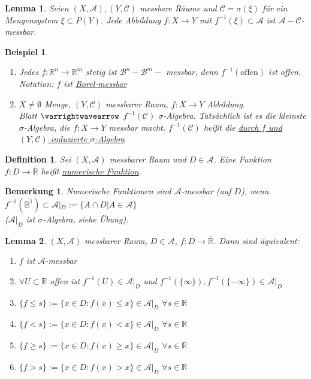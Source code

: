 \documentclass[11pt]{memoir}
\theoremstyle{changebreak}
\newtheorem{Definition}{Definition}[chapter]
\newtheorem{Bemerkung}{Bemerkung}[chapter]
\newtheorem{Beispiel}{Beispiel}[chapter]
\newtheorem{Lemma}{Lemma}[chapter]
\begin{document}
\begin{Lemma}
Seien $(X, \mathscr{A}), (Y, \mathscr{C})$ messbare Räume und $\mathscr{C} = \sigma(\xi)$ für ein Mengensystem $\xi \subset P(Y)$. Jede Abbildung $f: X \rightarrow Y$ mit $f^{-1}(\xi) \subset \mathscr{A}$ ist $\mathscr{A}-\mathscr{C}$-messbar.
\end{Lemma}

\begin{Beispiel}
\begin{enumerate}
	\item Jedes $f: \mathbb{R}^n \rightarrow \mathbb{R}^m$ stetig ist $\mathscr{B}^n-\mathscr{B}^m-$ messbar, denn $f^{-1}(\text{offen})$ ist offen. \\
	\emph{Notation}: $f$ ist \underline{Borel-messbar}
	\item $X \ne \emptyset$ Menge, $(Y, \mathscr{C})$ messbarer Raum, $f: X \rightarrow Y$ Abbildung. \\
	Blatt $\varrightwavearrow$ $f^{-1}(\mathscr{C})$ $\sigma$-Algebra. Tatsächlich ist es die kleinste $\sigma$-Algebra, die $f: X \rightarrow Y$ messbar macht. $f^{-1}(\mathscr{C})$ heißt die \underline{durch $f$ und $(Y, \mathscr{C})$ induzierte $\sigma$-Algebra}
\end{enumerate}
\end{Beispiel}

\begin{Definition}
Sei $(X, \mathscr{A})$ messbarer Raum und $D \in \mathscr{A}$. Eine Funktion $f: D \rightarrow \overline{\mathbb{R}}$ heißt \underline{numerische Funktion}.
\end{Definition}

\begin{Bemerkung}
Numerische Funktionen sind $\mathscr{A}$-messbar (auf $D$), wenn $f^{-1}(\overline{\mathbb{B}^1}) \subset \mathscr{A}|_D:= \{A \cap D |A \in \mathscr{A}\}$ \\
($\mathscr A | _D$ ist $\sigma$-Algebra, siehe Übung).
\end{Bemerkung}

\begin{Lemma}
$(X, \mathscr A)$ messbarer Raum, $D \in \mathscr A$, $f: D \rightarrow \overline {\mathbb R}$. Dann sind äquivalent:
\begin{enumerate}
	\item $f$ ist $\mathscr A$-messbar
	\item $\forall U \subset \mathbb R$ offen ist $f^{-1}(U) \in \mathscr A |_D$ und $f^{-1}(\{\infty\}), f^{-1}(\{-\infty\}) \in \mathscr A |_D$
	\item $\{f \leq s\} := \{x \in D: f(x) \leq x\} \in \mathscr A |_D$ $ \forall s \in \mathbb R$
	\item $\{f < s\} := \{x \in D: f(x) < x\} \in \mathscr A |_D$ $ \forall s \in \mathbb R$
	\item $\{f \geq s\} := \{x \in D: f(x) \geq x\} \in \mathscr A |_D$ $ \forall s \in \mathbb R$
	\item $\{f > s\} := \{x \in D: f(x) > x\} \in \mathscr A |_D$ $ \forall s \in \mathbb R$
\end{enumerate}
\end{Lemma}
\end{document}
